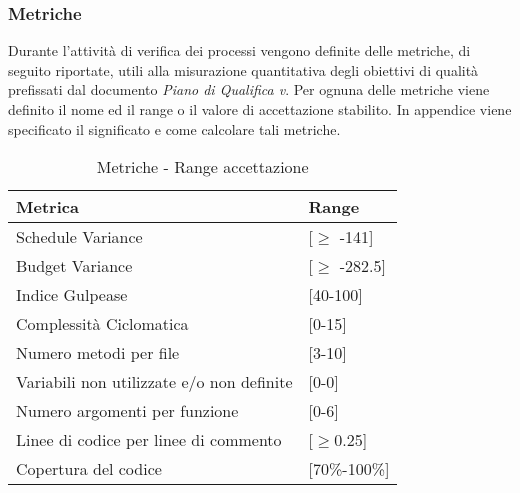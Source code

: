 \subsubsection{Metriche}
Durante l'attività di verifica dei processi vengono definite delle metriche, di seguito riportate, utili alla misurazione quantitativa degli obiettivi di qualità prefissati dal documento \emph{Piano di Qualifica v}\VersionePQ. Per ognuna delle metriche viene definito il nome ed il range o il valore di accettazione stabilito. In appendice viene specificato il significato e come calcolare tali metriche.\\
\begin{table}[H]
		\centering
		\begin{tabular}{|p{7cm}|p{2cm}|}
\hline
\textbf{Metrica} & \textbf{Range}\\ \hline
Schedule Variance & [\(\geq\) -141]\\ \hline
Budget Variance & [\(\geq\) -282.5]\\ \hline
Indice Gulpease & [40-100]\\ \hline
Complessità Ciclomatica & [0-15]\\ \hline
Numero metodi per file & [3-10] \\ \hline
Variabili non utilizzate e/o non definite & [0-0] \\ \hline
Numero argomenti per funzione & [0-6]\\ \hline
Linee di codice per linee di commento & [\(\geq\)0.25]\\ \hline
Copertura del codice & [70\%-100\%]\\ \hline
\end{tabular}
\caption {Metriche - Range accettazione}
\end{table}



  

    
      
      
      
      
      

        
        
    

